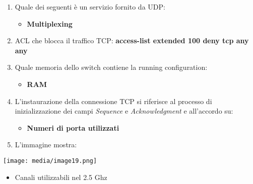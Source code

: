 \begin{enumerate}
\def\labelenumi{\arabic{enumi}.}
\item
  Quale dei seguenti è un servizio fornito da UDP:

  \begin{itemize}
  \item
    \textbf{Multiplexing}
  \end{itemize}
\item
  ACL che blocca il traffico TCP: \textbf{access-list extended 100 deny
  tcp any any}
\item
  Quale memoria dello switch contiene la running configuration:

  \begin{itemize}
  \item
    \textbf{RAM}
  \end{itemize}
\item
  L'instaurazione della connessione TCP si riferisce al processo di
  inizializzazione dei campi \emph{Sequence} e \emph{Acknowledgment} e
  all'accordo su:

  \begin{itemize}
  \item
    \textbf{Numeri di porta utilizzati}
  \end{itemize}
\item
  L'immagine mostra:
\end{enumerate}

\texttt{[image: media/image19.png]}

\begin{itemize}
\item
  Canali utilizzabili nel 2.5 Ghz
\end{itemize}

